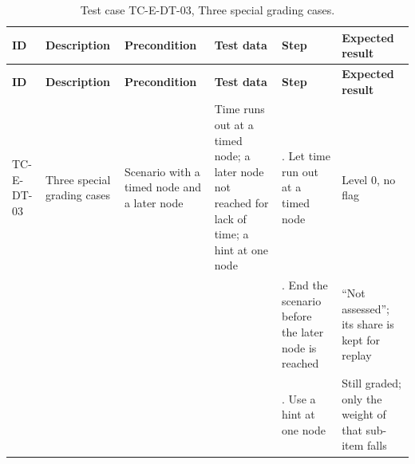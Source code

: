 {\footnotesize{}\renewcommand{\arraystretch}{1.1}
\begin{longtable}{|>{\raggedright\arraybackslash}p{}|>{\raggedright\arraybackslash}p{}|>{\raggedright\arraybackslash}p{}|>{\raggedright\arraybackslash}p{}|>{\raggedright\arraybackslash}p{}|>{\raggedright\arraybackslash}p{}|}
\caption{Test case TC-E-DT-03, Three special grading cases.} \\
\hline
\textbf{ID} & \textbf{Description} & \textbf{Precondition} & \textbf{Test data} & \textbf{Step} & \textbf{Expected result} \\ \hline
\endfirsthead
\hline
\textbf{ID} & \textbf{Description} & \textbf{Precondition} & \textbf{Test data} & \textbf{Step} & \textbf{Expected result} \\ \hline
\endhead
TC-E-DT-03 & Three special grading cases & Scenario with a timed node and a later node & Time runs out at a timed node; a later node not reached for lack of time; a hint at one node & 1. Let time run out at a timed node & Level 0, no flag \\ \cline{5-6}
 &  &  &  & 2. End the scenario before the later node is reached & ``Not assessed''; its share is kept for replay \\ \cline{5-6}
 &  &  &  & 3. Use a hint at one node & Still graded; only the weight of that sub-item falls \\ \hline
\end{longtable}
}

